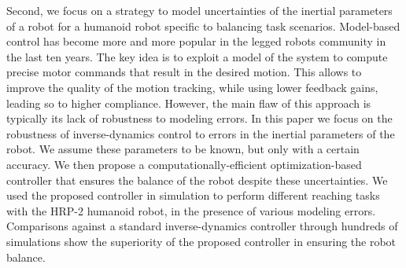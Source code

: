 \documentclass[english,a4paper,11pt,twoside,table]{StyleThese}
\begin{document}
\begin{vcenterpage}
 Second, we focus on a strategy to model uncertainties of the inertial parameters of a robot for a humanoid robot specific to balancing task scenarios. Model-based control has become more and more popular in the legged robots community in the last ten years. The key idea is to exploit a model of the system to compute precise motor commands that result in the desired motion. This allows to improve the quality of the motion tracking, while using lower feedback gains, leading so to higher compliance. However, the main flaw of this approach is typically its lack of robustness to modeling errors. In this paper we focus on the robustness of inverse-dynamics control to errors in the inertial parameters of the robot. We assume these parameters to be known, but only with a certain accuracy. We then propose a computationally-efficient optimization-based controller that ensures the balance of the robot despite these uncertainties. We used the proposed controller in simulation to perform different reaching tasks with the HRP-2 humanoid robot, in the presence of various modeling errors. Comparisons against a standard inverse-dynamics controller through hundreds of simulations show the superiority of the proposed controller in ensuring the robot balance.


\end{vcenterpage}

\tableofcontents

\printnomenclature
%
\mtcfixnomenclature

\mainmatter


%
%



% 


%


\end{document}
